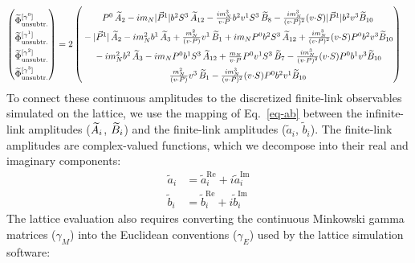 \begin{align}
    \begin{pmatrix}
        \rule{0pt}{16pt} \widetilde \Phi^{[\gamma^{0}]}_{\unsub}\\
        \rule{0pt}{16pt} \widetilde \Phi^{[\gamma^{1}]}_{\unsub}\\
        \rule{0pt}{16pt} \widetilde \Phi^{[\gamma^{2}]}_{\unsub}\\
        \rule{0pt}{16pt} \widetilde \Phi^{[\gamma^{3}]}_{\unsub}
    \end{pmatrix} &=2\begin{pmatrix}
       \rule{0pt}{16pt}  P^0\, \tAmp_2  - i \mN  |\vec{P}^1| \bvec^2 S^3\, \tAmp_{12}- \frac{ i \mN^3}{v \tcdot P}  \bvec^2 v^1 S^3\, \tBmp_8- \frac{i \mN^3}{(v \tcdot P)^2} (v \tcdot S)  |\vec{P}^1| \bvec^2 v^3 \tBmp_{10}\\
        \rule{0pt}{16pt} -|\vec{P}^1|\, \tAmp_2- i \mN^2 \bvec^1\, \tAmp_3+ \frac{\mN^2}{(v \tcdot P)} v^1\, \tBmp_1 
		+ i \mN  P^0 \bvec^2 S^3\, \tAmp_{12}+ \frac{i \mN^3}{(v \tcdot P)^2} (v \tcdot S)  P^0 \bvec^2 v^3 \tBmp_{10}\\
         \rule{0pt}{16pt} - i \mN^2 \bvec^2\, \tAmp_3
		- i \mN  P^0 \bvec^1 S^3\, \tAmp_{12}+ \frac{\mN}{v \tcdot P}  P^0 v^1 S^3\, \tBmp_7- \frac{i \mN^3}{(v \tcdot P)^2} (v \tcdot S) P^0 \bvec^1 v^3 \tBmp_{10}\\
        \rule{0pt}{16pt} \frac{\mN^2}{(v \tcdot P)} v^3\, \tBmp_1- \frac{i \mN^3}{(v \tcdot P)^2} (v \tcdot S)  P^0 \bvec^2 v^1 \tBmp_{10}
    \end{pmatrix}
\end{align}
\endgroup
To connect these continuous amplitudes to the discretized finite-link observables simulated on the lattice, we use the mapping of Eq.~\eqref{eq-ab} between the infinite-link amplitudes ($\widetilde{A}_i$, $\widetilde{B}_i$) and the finite-link amplitudes ($\tilde{a}_i$, $\tilde{b}_i$). The finite-link amplitudes are complex-valued functions, which we decompose into their real and imaginary components:
\begin{align}
    \tilde{a}_i&=\tilde{a}^{\text{Re}}_i+i\tilde{a}^{\text{Im}}_i\\
    \tilde{b}_i&=\tilde{b}^{\text{Re}}_i+i\tilde{b}^{\text{Im}}_i
\end{align}
The lattice evaluation also requires converting the continuous Minkowski gamma matrices ($\gamma_M$) into the Euclidean conventions ($\gamma_E$) used by the lattice simulation software:
